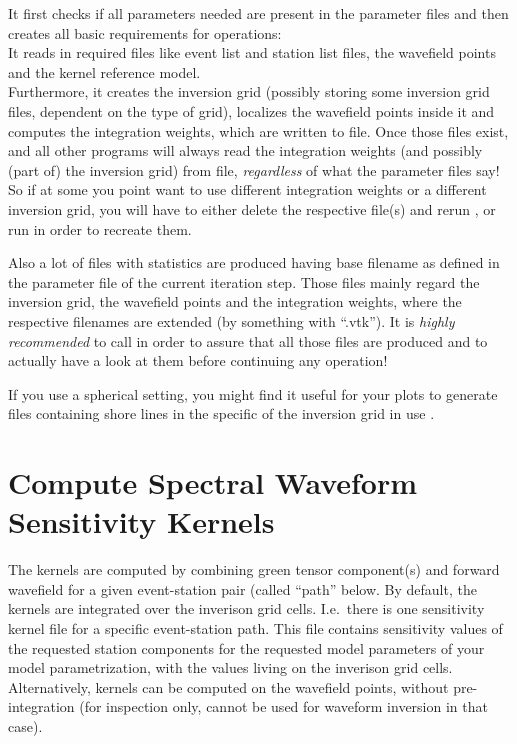 It first checks if all parameters needed are present in the parameter files and then creates all
basic requirements for \ASKI{} operations:\\
It reads in required files like event list and station list files, the wavefield points and the 
kernel reference model. \\
Furthermore, it creates the inversion grid (possibly storing some inversion grid files, dependent 
on the type of grid), localizes the wavefield points inside it and computes 
the integration weights, which are written to file. Once those files exist,  
and all other programs will always read the integration weights (and possibly (part of) the inversion grid) 
from file, \emph{regardless} of what the parameter files say! So if at some you point want to use 
different integration weights or a different inversion grid, you will have to either delete the respective 
file(s) and rerun , or run  in order
to recreate them. 

Also a lot of  files with statistics are produced having base filename  as 
defined in the parameter file of the current iteration step. Those files mainly regard the inversion grid, 
the wavefield points and the integration weights, where the respective filenames are extended (by something 
with ``.vtk''). It is \emph{highly recommended} to call  in order to assure that all
those  files are produced and to actually have a look at them before continuing any \ASKI{} operation!

If you use a spherical setting, you might find it useful for your plots to generate  files containing 
shore lines in the specific  of the inversion grid in use .
%
\section{Compute Spectral Waveform Sensitivity Kernels} \label{basic_steps,sec:compute_kernels}
%
The kernels are computed by combining green tensor component(s) and forward wavefield for a given event-station
pair (called ``path'' below. By default, the kernels are integrated over the inverison grid cells. I.e.\ there is one sensitivity 
kernel file for a specific event-station path. This file contains sensitivity values of the requested 
station components for the requested model parameters of your model parametrization, with 
the values living on the inverison grid cells. Alternatively, kernels can be computed on the wavefield points,
without pre-integration (for inspection only, cannot be used for waveform inversion in that case).

